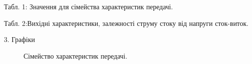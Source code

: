 \documentclass[a4paper,14pt]{extreport}
\begin{document}
\newpage




  \begin{center}Табл. 1: Значення для сімейства характеристик передачі.\end{center}
  \begin{figure}[h]
  \end{figure}


\newpage
\begin{landscape}
  \begin{center}Табл. 2:Вихідні характеристики, залежності струму стоку від напруги сток-виток.\end{center}
    \begin{figure}[h]
    \end{figure}
\end{landscape}


\newpage
\clearpage

\begin{center}3.  Графіки\\ \end{center}
\begin{figure}[h!]
\caption{Сімейство характеристик передачі.}
\label{ris2}
\end{figure}
\end{document}

